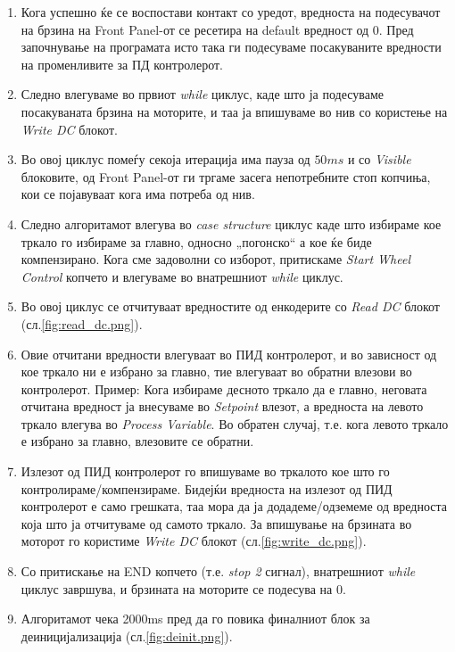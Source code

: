 \documentclass{article}
\begin{document}
\begin{enumerate}
\item Кога успешно ќе се воспостави контакт со уредот, вредноста на подесувачот на брзина на Front Panel-от се ресетира на default вредност од 0. Пред започнување на програмата исто така ги подесуваме посакуваните вредности на променливите за ПД контролерот.
\item Следно влегуваме во првиот \textit{while} циклус, каде што ја подесуваме посакуваната брзина на моторите, и таа ја впишуваме во нив со користење на \textit{Write DC} блокот.
\item Во овој циклус помеѓу секоја итерација има пауза од $50ms$ и со \textit{Visible} блоковите, од Front Panel-от ги тргаме засега непотребните стоп копчиња, кои се појавуваат кога има потреба од нив.
\item Следно алгоритамот влегува во \textit{case structure} циклус каде што избираме кое тркало го избираме за главно, односно „погонско“ а кое ќе биде компензирано. Кога сме задоволни со изборот, притискаме \textit{Start Wheel Control} копчето и влегуваме во внатрешниот \textit{while} циклус.
\item Во овој циклус се отчитуваат вредностите од енкодерите со \textit{Read DC} блокот (сл.\ref{fig:read_dc.png}).
\item Овие отчитани вредности влегуваат во ПИД контролерот, и во зависност од кое тркало ни е избрано за главно, тие влегуваат во обратни влезови во контролерот. Пример: Кога избираме десното тркало да е главно, неговата отчитана вредност ја внесуваме во \textit{Setpoint} влезот, а вредноста на левото тркало влегува во \textit{Process Variable}. Во обратен случај, т.е. кога левото тркало е избрано за главно, влезовите се обратни.
\item Излезот од ПИД контролерот го впишуваме во тркалото кое што го контролираме/компензираме. Бидејќи вредноста на излезот од ПИД контролерот е само грешката, таа мора да ја додадеме/одземеме од вредноста која што ја отчитуваме од самото тркало. За впишување на брзината во моторот го користиме \textit{Write DC} блокот (сл.\ref{fig:write_dc.png}).
\item Со притискање на END копчето (т.е. \textit{stop 2} сигнал), внатрешниот \textit{while} циклус завршува, и брзината на моторите се подесува на 0.
\item Алгоритамот чека 2000ms пред да го повика финалниот блок за деиницијализација (сл.\ref{fig:deinit.png}).
\end{enumerate}
\end{document}
